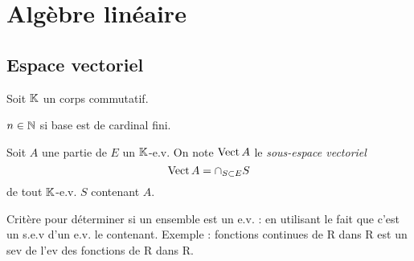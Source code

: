 \chapter{Algèbre linéaire}

\section{Espace vectoriel}

Soit $\operatorname{\mathbb{K}}$ un corps commutatif.
\begin{definition}
\end{definition}

\begin{definition}
\end{definition}

\begin{definition}
\end{definition}

\begin{definition}[Base]
\end{definition}

\begin{definition}[Dimension]
	$n\in\operatorname{\mathbb{N}}$ si base est de cardinal fini.
\end{definition}

\begin{definition}
	Soit $A$ une partie de $E$ un $\operatorname{\mathbb{K}}$-e.v.
	On note $\operatorname{Vect} A$ le \emph{sous-espace vectoriel}
	$$\operatorname{Vect} A = \cap_{S\subset E} S$$
	de tout $\operatorname{\mathbb{K}}$-e.v. $S$ contenant $A$.
\end{definition}

\begin{definition}[Stabilité]
\end{definition}

\begin{proposition}
	Critère pour déterminer si un ensemble est un e.v. : 
	en utilisant le fait que c'est un s.e.v d'un e.v. le contenant.
	Exemple : fonctions continues de R dans R est un sev de l'ev des fonctions de R dans R.
\end{proposition}

\begin{definition}
\end{definition}

\begin{definition}[Endomorphisme]
\end{definition}


